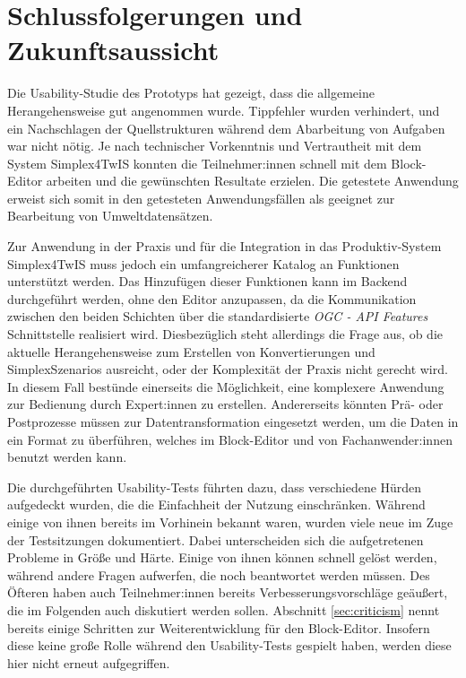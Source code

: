 \section{Schlussfolgerungen und Zukunftsaussicht}

Die Usability-Studie des Prototyps hat gezeigt, dass die allgemeine Herangehensweise gut angenommen wurde. Tippfehler wurden verhindert, und ein Nachschlagen der Quellstrukturen während dem Abarbeitung von Aufgaben war nicht nötig. Je nach technischer Vorkenntnis und Vertrautheit mit dem System Simplex4TwIS konnten die Teilnehmer:innen schnell mit dem Block-Editor arbeiten und die gewünschten Resultate erzielen. Die getestete Anwendung erweist sich somit in den getesteten Anwendungsfällen als geeignet zur Bearbeitung von Umweltdatensätzen.

Zur Anwendung in der Praxis und für die Integration in das Produktiv-System Simplex4TwIS muss jedoch ein umfangreicherer Katalog an Funktionen unterstützt werden. Das Hinzufügen dieser Funktionen kann im Backend durchgeführt werden, ohne den Editor anzupassen, da die Kommunikation zwischen den beiden Schichten über die standardisierte \textit{OGC - API Features} Schnittstelle realisiert wird. Diesbezüglich steht allerdings die Frage aus, ob die aktuelle Herangehensweise zum Erstellen von Konvertierungen und SimplexSzenarios ausreicht, oder der Komplexität der Praxis nicht gerecht wird. In diesem Fall bestünde einerseits die Möglichkeit, eine komplexere Anwendung zur Bedienung durch Expert:innen zu erstellen. Andererseits könnten Prä- oder Postprozesse müssen zur Datentransformation eingesetzt werden, um die Daten in ein Format zu überführen, welches im Block-Editor und von Fachanwender:innen benutzt werden kann.

Die durchgeführten Usability-Tests führten dazu, dass verschiedene Hürden aufgedeckt wurden, die die Einfachheit der Nutzung einschränken. Während einige von ihnen bereits im Vorhinein bekannt waren, wurden viele neue im Zuge der Testsitzungen dokumentiert. Dabei unterscheiden sich die aufgetretenen Probleme in Größe und Härte. Einige von ihnen können schnell gelöst werden, während andere Fragen aufwerfen, die noch beantwortet werden müssen. Des Öfteren haben auch Teilnehmer:innen bereits Verbesserungsvorschläge geäußert, die im Folgenden auch diskutiert werden sollen. Abschnitt \ref{sec:criticism} nennt bereits einige Schritten zur Weiterentwicklung für den Block-Editor. Insofern diese keine große Rolle während den Usability-Tests gespielt haben, werden diese hier nicht erneut aufgegriffen.

